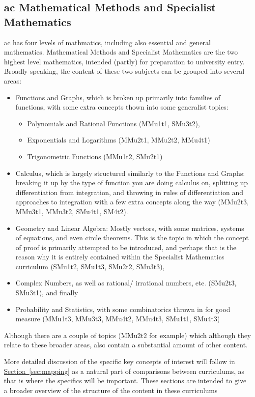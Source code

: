 \documentclass[twoside,12pt,a4paper]{report}
\newcommand{\refsec}[1]{\hyperref[sec:#1]{Section~\ref{sec:#1}}}
\begin{document}
\subsection{\gls{ac} Mathematical Methods and Specialist Mathematics}

 \gls{ac} has four levels of mathmatics, including also essential and general mathematics. Mathematical Methods and Specialist Mathematics are the two highest level mathematics, intended (partly) for preparation to university entry. Broadly speaking, the content of these two subjects can be grouped into several areas:
\begin{itemize}
	\item Functions and Graphs, which is broken up primarily into families of functions, with some extra concepts thown into some generalist topics:
		\begin{itemize}	
			\item Polynomials and Rational Functions (MMu1t1, SMu3t2),
			\item Exponentials and Logarithms (MMu2t1, MMu2t2, MMu4t1)
			\item Trigonometric Functions (MMu1t2, SMu2t1)
		\end{itemize}
	\item Calculus, which is largely structured similarly to the Functions and Graphs: breaking it up by the type of function you are doing calculus on, splitting up differentiation from integration, and throwing in rules of differentiation and approaches to integration with a few extra concepts along the way (MMu2t3, MMu3t1, MMu3t2, SMu4t1, SM4t2).
	\item Geometry and Linear Algebra: Mostly vectors, with some matrices, systems of equations, and even circle theorems. This is the topic in which the concept of proof is primarily attempted to be introduced, and perhaps that is the reason why it is entirely contained within the Specialist Mathematics curriculum (SMu1t2, SMu1t3, SMu2t2, SMu3t3),
	\item Complex Numbers, as well as rational/ irrational numbers, etc. (SMu2t3, SMu3t1), and finally
	\item Probability and Statistics, with some combinatorics thrown in for good measure (MMu1t3, MMu3t3, MMu4t2, MMu4t3, SMu1t1, SMu4t3)
\end{itemize}
Although there are a couple of topics (MMu2t2 for example) which although they relate to these broader areas, also contain a substantial amount of other content.

More detailed discussion of the specific key concepts of interest will follow in \refsec{mapping} as a natural part of comparisons between curriculums, as that is where the specifics will be important. These sections are intended to give a broader overview of the structure of the content in these curriculums
\end{document}

